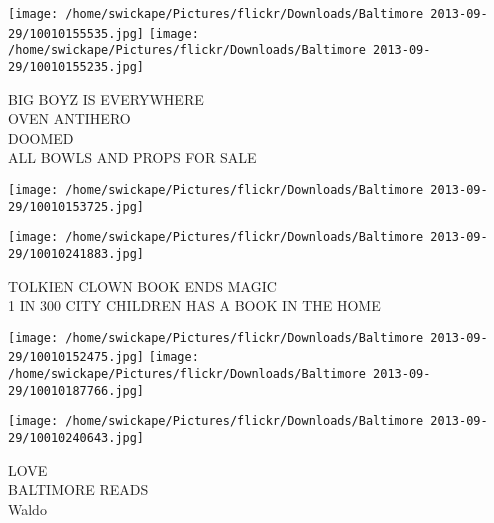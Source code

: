 \documentclass[10pt,letterpaper]{article}
\begin{document}
\texttt{[image: /home/swickape/Pictures/flickr/Downloads/Baltimore 2013-09-29/10010155535.jpg]}
\texttt{[image: /home/swickape/Pictures/flickr/Downloads/Baltimore 2013-09-29/10010155235.jpg]}

BIG BOYZ IS EVERYWHERE\\
OVEN ANTIHERO\\
DOOMED\\
ALL BOWLS AND PROPS FOR SALE\\
\pagebreak

\texttt{[image: /home/swickape/Pictures/flickr/Downloads/Baltimore 2013-09-29/10010153725.jpg]}

\vspace{0.25in}
\texttt{[image: /home/swickape/Pictures/flickr/Downloads/Baltimore 2013-09-29/10010241883.jpg]}

TOLKIEN CLOWN BOOK ENDS MAGIC\\
1 IN 300 CITY CHILDREN HAS A BOOK IN THE HOME\\
\pagebreak

\texttt{[image: /home/swickape/Pictures/flickr/Downloads/Baltimore 2013-09-29/10010152475.jpg]}
\texttt{[image: /home/swickape/Pictures/flickr/Downloads/Baltimore 2013-09-29/10010187766.jpg]}

\texttt{[image: /home/swickape/Pictures/flickr/Downloads/Baltimore 2013-09-29/10010240643.jpg]}

LOVE\\
BALTIMORE READS\\
Waldo\\
\pagebreak
\end{document}
